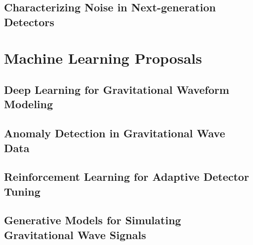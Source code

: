\subsection{Characterizing Noise in Next-generation Detectors}\label{subsec:characterizing-noise-in-next-generation-detectors}
\section{Machine Learning Proposals}\label{sec:machine-learning-proposals}
\subsection{Deep Learning for Gravitational Waveform Modeling}\label{subsec:deep-learning-for-gravitational-waveform-modeling}
\subsection{Anomaly Detection in Gravitational Wave Data}\label{subsec:anomaly-detection-in-gravitational-wave-data}
\subsection{Reinforcement Learning for Adaptive Detector Tuning}\label{subsec:reinforcement-learning-for-adaptive-detector-tuning}
\subsection{Generative Models for Simulating Gravitational Wave Signals}\label{subsec:generative-models-for-simulating-gravitational-wave-signals}
